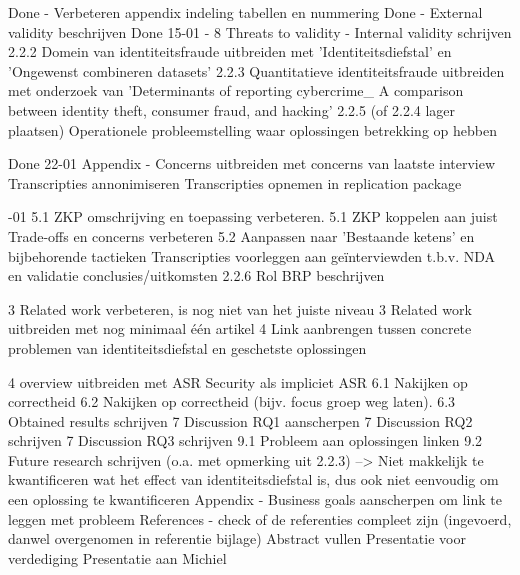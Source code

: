 Done - Verbeteren appendix indeling tabellen en nummering
Done - External validity beschrijven
Done 15-01 - 
8 Threats to validity - Internal validity schrijven
2.2.2 Domein van identiteitsfraude uitbreiden met 'Identiteitsdiefstal' en 'Ongewenst combineren datasets'
2.2.3 Quantitatieve identiteitsfraude uitbreiden met onderzoek van 'Determinants of reporting cybercrime_ A
comparison between identity theft, consumer fraud, and hacking'
2.2.5 (of 2.2.4 lager plaatsen) Operationele probleemstelling waar oplossingen betrekking op hebben

Done 22-01
Appendix - Concerns uitbreiden met concerns van laatste interview
Transcripties annonimiseren
Transcripties opnemen in replication package

-01
5.1 ZKP omschrijving en toepassing verbeteren.
5.1 ZKP koppelen aan juist Trade-offs en concerns verbeteren
5.2 Aanpassen naar 'Bestaande ketens' en bijbehorende tactieken
Transcripties voorleggen aan geïnterviewden t.b.v. NDA en validatie conclusies/uitkomsten
2.2.6 Rol BRP beschrijven

3 Related work verbeteren, is nog niet van het juiste niveau
3 Related work uitbreiden met nog minimaal één artikel
4 Link aanbrengen tussen concrete problemen van identiteitsdiefstal en geschetste oplossingen

4 overview uitbreiden met ASR Security als impliciet ASR
6.1 Nakijken op correctheid
6.2 Nakijken op correctheid (bijv. focus groep weg laten).
6.3 Obtained results schrijven
7 Discussion RQ1 aanscherpen
7 Discussion RQ2 schrijven
7 Discussion RQ3 schrijven
9.1 Probleem aan oplossingen linken
9.2 Future research schrijven (o.a. met opmerking uit 2.2.3)
--> Niet makkelijk te kwantificeren wat het effect van identiteitsdiefstal is, dus ook niet eenvoudig om een oplossing te kwantificeren
Appendix - Business goals aanscherpen om link te leggen met probleem
References - check of de referenties compleet zijn (ingevoerd, danwel overgenomen in referentie bijlage)
Abstract vullen
Presentatie voor verdediging
Presentatie aan Michiel